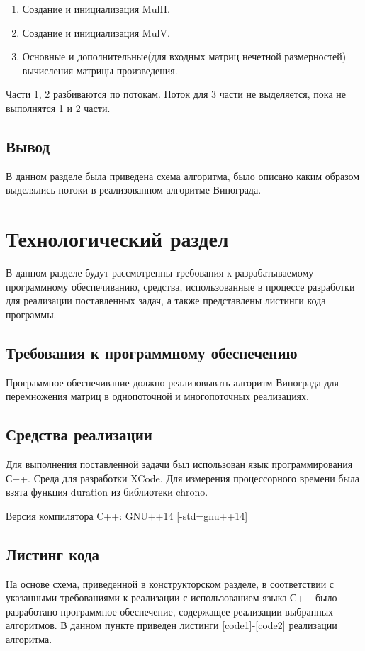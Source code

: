 \documentclass[12pt, a4paper]{report}
\begin{document}
	\begin{enumerate}
		\item Создание и инициализация MulH.
		\item Создание и инициализация MulV.
		\item Основные и дополнительные(для входных матриц нечетной размерностей) вычисления матрицы произведения.
	\end{enumerate}

	Части 1, 2 разбиваются по потокам. Поток для 3 части не выделяется, пока не выполнятся 1 и 2 части.

	
	\section{Вывод}
	В данном разделе была приведена схема алгоритма, было описано каким образом выделялись потоки в реализованном алгоритме Винограда.
	
	\newpage
	
	\chapter{Технологический раздел}
	\vspace{-0.5cm}В данном разделе будут рассмотренны требования к разрабатываемому программному обеспечиванию, средства, использованные в процессе разработки для реализации поставленных задач, а также представлены листинги кода программы.
	
	\section{Требования к программному обеспечению}
	Программное обеспечивание должно реализовывать алгоритм Винограда для перемножения матриц в однопоточной и многопоточных реализациях.
	
	\section{Средства реализации}
	\hspace{0.6cm}Для выполнения поставленной задачи был использован язык программирования С++. Среда для разработки XCode. Для измерения процессорного времени была взята функция duration из библиотеки chrono.
	
	\vspace{0.2cm}Версия компилятора C++: GNU++14 [-std=gnu++14]
	
	
	\section{Листинг кода}
	\hspace{0.6cm}На основе схема, приведенной в конструкторском разделе, в соответствии с указанными требованиями к реализации с использованием языка С++ было разработано программное обеспечение, содержащее реализации выбранных алгоритмов. В данном пункте приведен листинги \ref{code1}-\ref{code2} реализации алгоритма.
\end{document}

